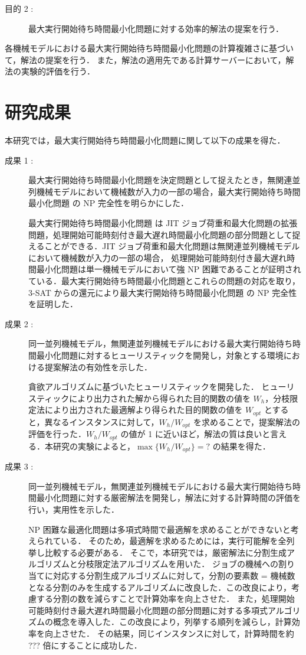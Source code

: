 \documentclass[12pt]{optlab-bachelor}
\begin{document}
\begin{description}
  \item[目的 2 :]
  最大実行開始待ち時間最小化問題に対する効率的解法の提案を行う．
\end{description}

各機械モデルにおける最大実行開始待ち時間最小化問題の計算複雑さに基づいて，解法の提案を行う．
また，解法の適用先である計算サーバーにおいて，解法の実験的評価を行う．

\section{研究成果}
本研究では，最大実行開始待ち時間最小化問題に関して以下の成果を得た．
\begin{description}
  \item[成果 1 :]
  最大実行開始待ち時間最小化問題を決定問題として捉えたとき，無関連並列機械モデルにおいて機械数が入力の一部の場合，最大実行開始待ち時間最小化問題 の NP 完全性を明らかにした．

  最大実行開始待ち時間最小化問題 は JIT ジョブ荷重和最大化問題の拡張問題，処理開始可能時刻付き最大遅れ時間最小化問題の部分問題として捉えることができる．JIT ジョブ荷重和最大化問題は無関連並列機械モデルにおいて機械数が入力の一部の場合， 処理開始可能時刻付き最大遅れ時間最小化問題は単一機械モデルにおいて強 NP 困難であることが証明されている．最大実行開始待ち時間最小化問題とこれらの問題の対応を取り，\textsc{3-SAT} からの還元により最大実行開始待ち時間最小化問題 の NP 完全性を証明した．

  \item[成果 2 :]
  同一並列機械モデル，無関連並列機械モデルにおける最大実行開始待ち時間最小化問題に対するヒューリスティックを開発し，対象とする環境における提案解法の有効性を示した．

  貪欲アルゴリズムに基づいたヒューリスティックを開発した．
  ヒューリスティックにより出力された解から得られた目的関数の値を $W_h$，分枝限定法により出力された最適解より得られた目的関数の値を $W_{opt}$ とすると，異なるインスタンスに対して，$W_h/W_{opt}$ を求めることで，提案解法の評価を行った．$W_h/W_{opt}$ の値が 1 に近いほど，解法の質は良いと言える．本研究の実験によると，$\max\big\{W_h/W_{opt}\big\} = ?$ の結果を得た．

  \item[成果 3 :]
  同一並列機械モデル，無関連並列機械モデルにおける最大実行開始待ち時間最小化問題に対する厳密解法を開発し，解法に対する計算時間の評価を行い，実用性を示した．

  NP 困難な最適化問題は多項式時間で最適解を求めることができないと考えられている．
  そのため，最適解を求めるためには，実行可能解を全列挙し比較する必要がある．
  そこで，本研究では，厳密解法に分割生成アルゴリズムと分枝限定法アルゴリズムを用いた．
  ジョブの機械への割り当てに対応する分割生成アルゴリズムに対して，分割の要素数 = 機械数 となる分割のみを生成するアルゴリズムに改良した．この改良により，考慮する分割の数を減らすことで計算効率を向上させた．
  また，処理開始可能時刻付き最大遅れ時間最小化問題の部分問題に対する多項式アルゴリズムの概念を導入した．この改良により，列挙する順列を減らし，計算効率を向上させた．
  その結果，同じインスタンスに対して，計算時間を約 ??? 倍にすることに成功した．


\end{description}
\end{document}
